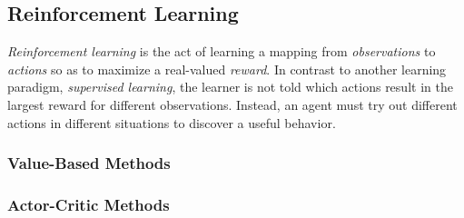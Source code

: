 \subsection{Reinforcement Learning}
\textit{Reinforcement learning} is the act of learning a mapping from \textit{observations} to \textit{actions} so as to maximize a real-valued \textit{reward}. In contrast to another learning paradigm, \textit{supervised learning}, the learner is not told which actions result in the largest reward for different observations. Instead, an agent must try out different actions in different situations to discover a useful behavior. \cite{sutton}




\subsubsection{Value-Based Methods}
\subsubsection{Actor-Critic Methods}